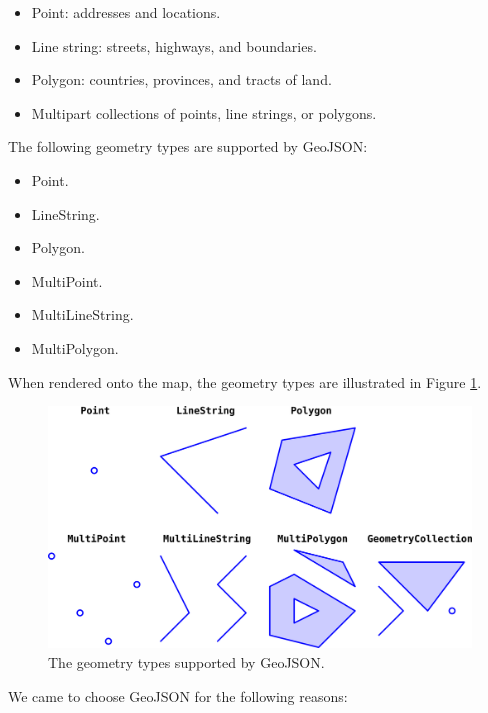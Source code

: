 \begin{itemize}
    \item Point: addresses and locations.
    \item Line string: streets, highways, and boundaries.
    \item Polygon: countries, provinces, and tracts of land.
    \item Multipart collections of points, line strings, or polygons.
\end{itemize}

The following geometry types are supported by GeoJSON:

\begin{itemize}
    \item Point.
    \item LineString.
    \item Polygon.
    \item MultiPoint.
    \item MultiLineString.
    \item MultiPolygon.
\end{itemize}

When rendered onto the map, the geometry types are illustrated in Figure \ref{fig:geojson_geometry}.

\begin{figure}[H]
    \centering
    \includegraphics[width=\textwidth]{assets/images/Research/geojson/geojson_features.png}
    \caption{The geometry types supported by GeoJSON.}
    \label{fig:geojson_geometry}
\end{figure}


We came to choose GeoJSON for the following reasons:

